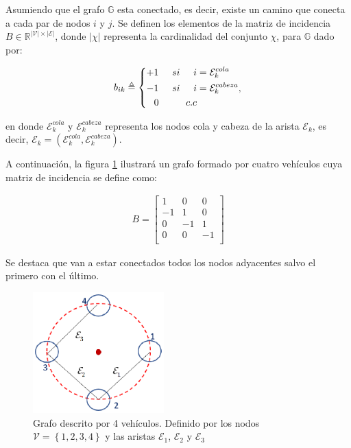 Asumiendo que el grafo $\mathbb{G}$ esta conectado, es decir, existe un camino que conecta a cada par de nodos $i$ y $j$. Se definen los elementos de la matriz de incidencia $B\in\mathbb{R}^{|\mathcal{V}|\times|\mathcal{E}|}$, donde $|\chi|$ representa la cardinalidad del conjunto $\chi$, para $\mathbb{G}$ dado por:

\begin{equation} \label{Incidence}
  b_{ik}\triangleq\left \{
    \begin{aligned}
+1\hspace{5mm}si\hspace{5mm}i&=\mathcal{E}^{cola}_{k}\\
-1\hspace{5mm}si\hspace{5mm}i&=\mathcal{E}^{cabeza}_{k},\\
0\hspace{10mm}c.c\\
    \end{aligned}
  \right .
\end{equation}

en donde $\mathcal{E}^{cola}_{k}$ y $\mathcal{E}^{cabeza}_{k}$ representa los nodos cola y cabeza de la arista $\mathcal{E}_{k}$, es decir, $\mathcal{E}_{k}=\left(\mathcal{E}^{cola}_{k},\mathcal{E}^{cabeza}_{k}\right)$. 

A continuación, la figura \ref{Grafo_Demostracion} ilustrará un grafo formado por cuatro vehículos cuya matriz de incidencia se define como:

\begin{equation} \label{Incidence_Matrix}
	\begin{aligned}
	{B}= 	
	\begin{bmatrix}
		 1 &  0  &  0\\
		-1 &  1  &  0\\
		 0 & -1  &  1\\
		 0 &  0 &  -1\\
	\end{bmatrix}
	\end{aligned}
\end{equation}

Se destaca que van a estar conectados todos los nodos adyacentes salvo el primero con el último.

\begin{figure}[H]
\centering
\includegraphics[width=0.45\textwidth]{figures/Grafo.eps}
\caption{Grafo descrito por 4 vehículos. Definido por los nodos $\mathcal{V}=\left\lbrace{1,2,3,4}\right\rbrace$ y las aristas $\mathcal{E}_1$, $\mathcal{E}_2$ y $\mathcal{E}_3$} \label{Grafo_Demostracion}
\end{figure}

